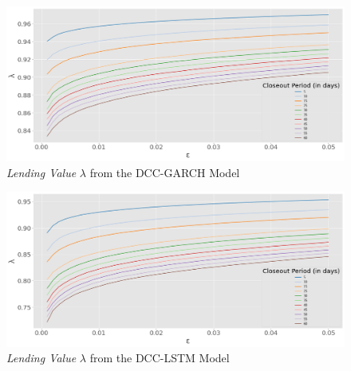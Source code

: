 \documentclass[a4paper, oneside]{discothesis}
\begin{document}
\begin{figure}[h]
    \centering
    \includegraphics[width = 13cm]{figures/ll_lines_garch.png}
    \caption{\textit{Lending Value} $\lambda$ from the DCC-GARCH Model}
    \label{fig:garch_lines}
\end{figure}

\begin{figure}[h]
    \centering
    \includegraphics[width = 13cm]{figures/ll_lines_lstm.png}
    \caption{\textit{Lending Value} $\lambda$ from the DCC-LSTM Model}
    \label{fig:lstm_lines}
\end{figure}
\end{document}
